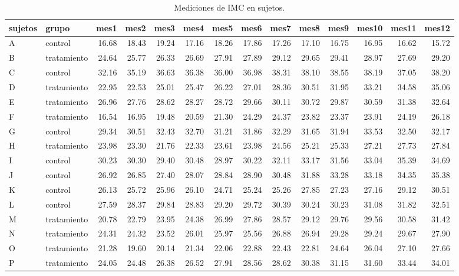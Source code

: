 \documentclass[]{article}
\begin{document}
\begin{table}[ht]
\centering
\begingroup\tiny
\begin{tabular}{llrrrrrrrrrrrr}
  \hline
sujetos & grupo & mes1 & mes2 & mes3 & mes4 & mes5 & mes6 & mes7 & mes8 & mes9 & mes10 & mes11 & mes12 \\ 
  \hline
A & control & 16.68 & 18.43 & 19.24 & 17.16 & 18.26 & 17.86 & 17.26 & 17.10 & 16.75 & 16.95 & 16.62 & 15.72 \\ 
  B & tratamiento & 24.64 & 25.77 & 26.33 & 26.69 & 27.91 & 27.89 & 29.12 & 29.65 & 29.41 & 28.97 & 27.69 & 29.20 \\ 
  C & control & 32.16 & 35.19 & 36.63 & 36.38 & 36.00 & 36.98 & 38.31 & 38.10 & 38.55 & 38.19 & 37.05 & 38.20 \\ 
  D & tratamiento & 22.95 & 22.53 & 25.01 & 25.47 & 26.22 & 27.01 & 28.36 & 30.51 & 31.95 & 33.21 & 34.58 & 35.06 \\ 
  E & tratamiento & 26.96 & 27.76 & 28.62 & 28.27 & 28.72 & 29.66 & 30.11 & 30.72 & 29.87 & 30.59 & 31.38 & 32.64 \\ 
  F & tratamiento & 16.54 & 16.95 & 19.48 & 20.59 & 21.30 & 24.29 & 24.37 & 23.82 & 23.37 & 23.91 & 24.19 & 26.18 \\ 
  G & control & 29.34 & 30.51 & 32.43 & 32.70 & 31.21 & 31.86 & 32.29 & 31.65 & 31.94 & 33.53 & 32.50 & 32.17 \\ 
  H & tratamiento & 23.98 & 23.30 & 21.76 & 22.33 & 23.61 & 23.98 & 24.56 & 25.21 & 25.33 & 27.21 & 27.73 & 27.84 \\ 
  I & control & 30.23 & 30.30 & 29.40 & 30.48 & 28.97 & 30.22 & 32.11 & 33.17 & 31.56 & 33.04 & 35.39 & 34.69 \\ 
  J & control & 26.92 & 26.85 & 27.40 & 28.07 & 28.84 & 28.90 & 30.48 & 31.88 & 33.28 & 33.18 & 34.35 & 35.38 \\ 
  K & control & 26.13 & 25.72 & 25.96 & 26.10 & 24.71 & 25.24 & 25.26 & 27.85 & 27.23 & 27.16 & 29.12 & 30.51 \\ 
  L & control & 27.59 & 28.37 & 29.84 & 28.83 & 29.20 & 29.72 & 30.39 & 30.24 & 30.23 & 31.08 & 31.82 & 32.51 \\ 
  M & tratamiento & 20.78 & 22.79 & 23.95 & 24.38 & 26.99 & 27.86 & 28.57 & 29.12 & 29.76 & 29.56 & 30.58 & 31.42 \\ 
  N & tratamiento & 24.31 & 24.32 & 23.52 & 26.01 & 25.97 & 25.56 & 26.88 & 26.94 & 29.28 & 29.24 & 29.67 & 27.90 \\ 
  O & tratamiento & 21.28 & 19.60 & 20.14 & 21.34 & 22.06 & 22.88 & 22.43 & 22.81 & 24.64 & 26.04 & 27.10 & 27.66 \\ 
  P & tratamiento & 24.05 & 24.48 & 26.38 & 26.52 & 27.91 & 28.56 & 28.62 & 30.38 & 31.15 & 31.60 & 33.44 & 34.01 \\ 
   \hline
\end{tabular}
\endgroup
\caption{Mediciones de IMC en sujetos.} 
\label{tab:sujetos}
\end{table}
\end{document}
